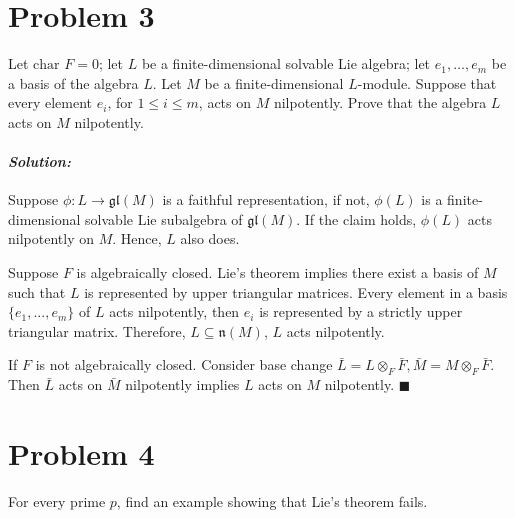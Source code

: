 \documentclass[12pt, a4paper]{article}
\newenvironment{solution}
  {\paragraph{\textit{Solution:}}\par\medskip}
  {\hfill$\blacksquare$\vspace{0.1cm}}
\begin{document}
\section*{Problem 3}
Let $\text{char } F = 0$; let $L$ be a finite-dimensional solvable Lie algebra; let $e_1, \dots, e_m$ be a basis of the algebra $L$. Let $M$ be a finite-dimensional $L$-module. Suppose that every element $e_i$, for $1 \le i \le m$, acts on $M$ nilpotently. Prove that the algebra $L$ acts on $M$ nilpotently.

\begin{solution}
  Suppose $\phi:L \to \mathfrak{gl}(M)$ is a faithful representation, if not, $\phi(L)$ is a finite-dimensional solvable Lie subalgebra of $\mathfrak{gl}(M)$. If the claim holds, $\phi(L)$ acts nilpotently on $M$. Hence, $L$ also does. 
  
  Suppose $F$ is algebraically closed. Lie's theorem implies there exist a basis of $M$ such that $L$ is represented by upper triangular matrices. Every element in a basis $\{e_1,...,e_m\}$ of $L$ acts nilpotently, then $e_i$ is represented by a strictly upper triangular matrix. Therefore, $L\subseteq \mathfrak{n}(M)$, $L$ acts nilpotently.

  If $F$ is not algebraically closed. Consider base change $\bar{L} = L \otimes_{F} \bar{F}, \bar{M} = M \otimes_{F} \bar{F}$. Then $\bar{L}$ acts on $\bar{M}$ nilpotently implies $L$ acts on $M$ nilpotently.
\end{solution}
\section*{Problem 4}
For every prime $p$, find an example showing that Lie's theorem fails.
\end{document}
